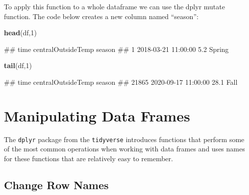 \documentclass[
  a4paperpaper,
]{book}
\newenvironment{Shaded}{\begin{snugshade}}{\end{snugshade}}
\newcommand{\DataTypeTok}[1]{\textcolor[rgb]{0.13,0.29,0.53}{#1}}
\newcommand{\DecValTok}[1]{\textcolor[rgb]{0.00,0.00,0.81}{#1}}
\newcommand{\KeywordTok}[1]{\textcolor[rgb]{0.13,0.29,0.53}{\textbf{#1}}}
\newcommand{\NormalTok}[1]{#1}
\newcommand{\OperatorTok}[1]{\textcolor[rgb]{0.81,0.36,0.00}{\textbf{#1}}}
\newcommand{\StringTok}[1]{\textcolor[rgb]{0.31,0.60,0.02}{#1}}
\let\oldShaded\Shaded
\let\endoldShaded\endShaded
\renewenvironment{Shaded}{\footnotesize\oldShaded}{\endoldShaded}
\let\oldverbatim\verbatim
\let\endoldverbatim\endverbatim
\renewenvironment{verbatim}{\footnotesize\oldverbatim}{\endoldverbatim}
\begin{document}
To apply this function to a whole dataframe we can use the dplyr mutate function. The code below creates a new column named ``season'':

\begin{Shaded}
\end{Shaded}

\begin{Shaded}
\begin{Highlighting}[]
\KeywordTok{head}\NormalTok{(df,}\DecValTok{1}\NormalTok{)}
\end{Highlighting}
\end{Shaded}

\begin{verbatim}
##                  time centralOutsideTemp season
## 1 2018-03-21 11:00:00                5.2 Spring
\end{verbatim}

\begin{Shaded}
\begin{Highlighting}[]
\KeywordTok{tail}\NormalTok{(df,}\DecValTok{1}\NormalTok{)}
\end{Highlighting}
\end{Shaded}

\begin{verbatim}
##                      time centralOutsideTemp season
## 21865 2020-09-17 11:00:00               28.1   Fall
\end{verbatim}

\newpage

\hypertarget{manipulating-data-frames}{%
\section{Manipulating Data Frames}\label{manipulating-data-frames}}

The \texttt{dplyr} package from the \texttt{tidyverse} introduces functions that perform some of the most common operations when working with data frames and uses names for these functions that are relatively easy to remember.

\hypertarget{change-row-names}{%
\subsection{Change Row Names}\label{change-row-names}}
\end{document}
